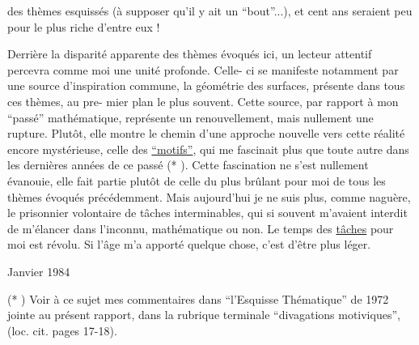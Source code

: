 
des thèmes esquissés (à supposer qu'il y ait un ``bout''...), et
cent ans seraient peu pour le plus riche d'entre eux !

Derrière la disparité apparente des thèmes évoqués ici,
un lecteur attentif percevra comme moi une unité profonde. Celle-%
ci se manifeste notamment par une source d'inspiration commune,
la géométrie des surfaces, présente dans tous ces thèmes, au pre-%
mier plan le plus souvent. Cette source, par rapport à mon ``passé''
mathématique, représente un renouvellement, mais nullement une
rupture. Plutôt, elle montre le chemin d'une approche nouvelle
vers cette réalité encore mystérieuse, celle des \uline{``motifs''}, qui me
fascinait plus que toute autre dans les dernières années de ce
passé (* ). Cette fascination ne s'est nullement évanouie,
elle fait partie plutôt de celle du plus brûlant pour moi de tous
les thèmes évoqués précédemment. Mais aujourd'hui je ne suis plus,
comme naguère, le prisonnier volontaire de tâches interminables,
qui si souvent m'avaient interdit de m'élancer dans l'inconnu,
mathématique ou non. Le temps des \uline{tâches} pour moi est révolu. Si
l'âge m'a apporté quelque chose, c'est d'être plus léger.

Janvier 1984

(* ) Voir à ce sujet mes commentaires dans ``l'Esquisse Thématique''
de 1972 jointe au présent rapport, dans la rubrique terminale
``divagations motiviques'', (loc. cit. pages 17-18).

